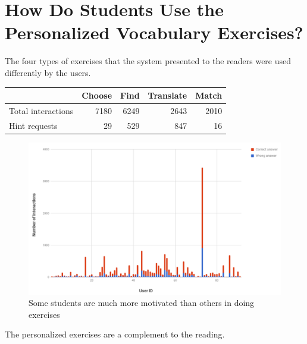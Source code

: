 \section{How Do Students Use the Personalized Vocabulary Exercises?}

The four types of exercises that the system presented to the readers were used differently by the users. 

\begin{tabular}{lrrrr}
                    & Choose  & Find & Translate & Match \\ \hline
Total interactions  & 7180    & 6249 & 2643      & 2010\\
Hint requests       & 29      & 529  & 847       & 16 \\ \hline


\end{tabular}

  \begin{figure}[h!]
  \centering
    \includegraphics[width=\columnwidth]{figures/exercise_interactions_count.png}
    \caption{Some students are much more motivated than others in doing exercises }
  \end{figure}

The personalized exercises are a complement to the reading. 

